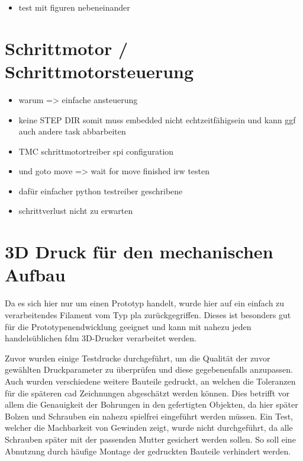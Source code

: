 \begin{itemize}
\tightlist
\item
  test mit figuren nebeneinander
\end{itemize}

\hypertarget{schrittmotor-schrittmotorsteuerung}{%
\section{Schrittmotor /
Schrittmotorsteuerung}\label{schrittmotor-schrittmotorsteuerung}}

\begin{itemize}
\tightlist
\item
  warum =\textgreater{} einfache ansteuerung
\item
  keine STEP DIR somit muss embedded nicht echtzeitfähigsein und kann
  ggf auch andere task abbarbeiten
\item
  TMC schrittmotortreiber spi configuration
\item
  und goto move =\textgreater{} wait for move finished irw testen
\item
  dafür einfacher python testreiber geschribene
\item
  schrittverlust nicht zu erwarten
\end{itemize}

\hypertarget{d-druck-fuxfcr-den-mechanischen-aufbau}{%
\section{3D Druck für den mechanischen
Aufbau}\label{d-druck-fuxfcr-den-mechanischen-aufbau}}

Da es sich hier nur um einen Prototyp handelt, wurde hier auf ein
einfach zu verarbeitendes Filament vom Typ \gls{pla} zurückgegriffen.
Dieses ist besonders gut für die Prototypenendwicklung geeignet und kann
mit nahezu jeden handelsüblichen \gls{fdm} 3D-Drucker verarbeitet
werden.

Zuvor wurden einige Testdrucke durchgeführt, um die Qualität der zuvor
gewählten Druckparameter zu überprüfen und diese gegebenenfalls
anzupassen. Auch wurden verschiedene weitere Bauteile gedruckt, an
welchen die Toleranzen für die späteren \gls{cad} Zeichnungen
abgeschätzt werden können. Dies betrifft vor allem die Genauigkeit der
Bohrungen in den gefertigten Objekten, da hier später Bolzen und
Schrauben ein nahezu spielfrei eingeführt werden müssen. Ein Test,
welcher die Machbarkeit von Gewinden zeigt, wurde nicht durchgeführt, da
alle Schrauben später mit der passenden Mutter gesichert werden sollen.
So soll eine Abnutzung durch häufige Montage der gedruckten Bauteile
verhindert werden.


